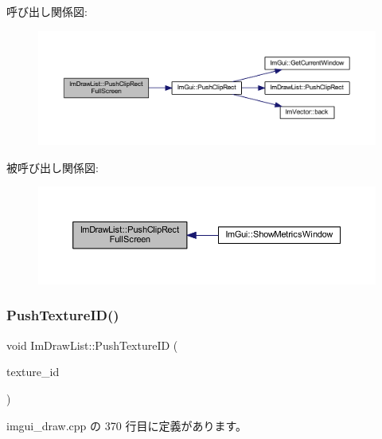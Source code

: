 呼び出し関係図\+:\nopagebreak
\begin{figure}[H]
\begin{center}
\leavevmode
\includegraphics[width=350pt]{struct_im_draw_list_a0ab1ab409f0e269755e50a77901bae39_cgraph}
\end{center}
\end{figure}
被呼び出し関係図\+:\nopagebreak
\begin{figure}[H]
\begin{center}
\leavevmode
\includegraphics[width=350pt]{struct_im_draw_list_a0ab1ab409f0e269755e50a77901bae39_icgraph}
\end{center}
\end{figure}
\mbox{\label{struct_im_draw_list_ac0dc0ecf692ab4c6ce58dd5381efb20d}} 
\subsubsection{\texorpdfstring{Push\+Texture\+I\+D()}{PushTextureID()}}
{\footnotesize\ttfamily void Im\+Draw\+List\+::\+Push\+Texture\+ID (\begin{DoxyParamCaption}\item[{const \mbox{\hyperlink{imgui_8h_a364f4447ecbc4ca176145ccff9db6286}{Im\+Texture\+ID}} \&}]{texture\+\_\+id }\end{DoxyParamCaption})}



 imgui\+\_\+draw.\+cpp の 370 行目に定義があります。

\mbox{\label{struct_im_draw_list_a5978db1fc49be781978699e85c6a3251}} 
